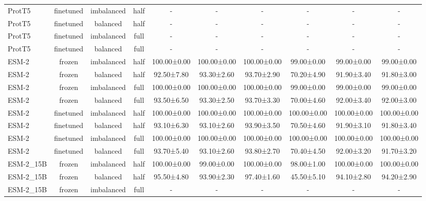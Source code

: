 \begin{tabular}{lccccccccc}
      ProtT5 &      finetuned & imbalanced &      half &           - &           - &           - &           - &           - &           - \\
      ProtT5 &      finetuned &   balanced &      half &           - &           - &           - &           - &           - &           - \\
      ProtT5 &      finetuned & imbalanced &      full &           - &           - &           - &           - &           - &           - \\
      ProtT5 &      finetuned &   balanced &      full &           - &           - &           - &           - &           - &           - \\
       ESM-2 &         frozen & imbalanced &      half & 100.00±0.00 & 100.00±0.00 & 100.00±0.00 &  99.00±0.00 &  99.00±0.00 &  99.00±0.00 \\
       ESM-2 &         frozen &   balanced &      half &  92.50±7.80 &  93.30±2.60 &  93.70±2.90 &  70.20±4.90 &  91.90±3.40 &  91.80±3.00 \\
       ESM-2 &         frozen & imbalanced &      full & 100.00±0.00 & 100.00±0.00 & 100.00±0.00 &  99.00±0.00 &  99.00±0.00 &  99.00±0.00 \\
       ESM-2 &         frozen &   balanced &      full &  93.50±6.50 &  93.30±2.50 &  93.70±3.30 &  70.00±4.60 &  92.00±3.40 &  92.00±3.00 \\
       ESM-2 &      finetuned & imbalanced &      half & 100.00±0.00 & 100.00±0.00 & 100.00±0.00 & 100.00±0.00 & 100.00±0.00 & 100.00±0.00 \\
       ESM-2 &      finetuned &   balanced &      half &  93.10±6.30 &  93.10±2.60 &  93.90±3.50 &  70.50±4.60 &  91.90±3.10 &  91.80±3.40 \\
       ESM-2 &      finetuned & imbalanced &      full & 100.00±0.00 & 100.00±0.00 & 100.00±0.00 & 100.00±0.00 & 100.00±0.00 & 100.00±0.00 \\
       ESM-2 &      finetuned &   balanced &      full &  93.70±5.40 &  93.10±2.60 &  93.80±2.70 &  70.40±4.50 &  92.00±3.20 &  91.70±3.20 \\
   ESM-2\_15B &         frozen & imbalanced &      half & 100.00±0.00 &  99.00±0.00 & 100.00±0.00 &  98.00±1.00 & 100.00±0.00 & 100.00±0.00 \\
   ESM-2\_15B &         frozen &   balanced &      half &  95.50±4.80 &  93.90±2.30 &  97.40±1.60 &  45.50±5.10 &  94.10±2.80 &  94.20±2.90 \\
   ESM-2\_15B &         frozen & imbalanced &      full &           - &           - &           - &           - &           - &           - \\

\end{tabular}
